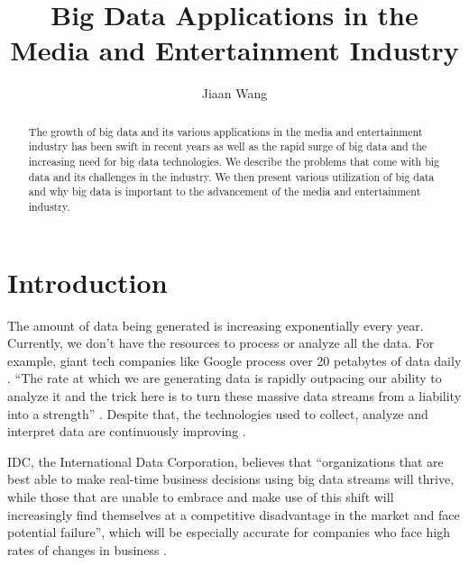 \title{Big Data Applications in the Media and Entertainment Industry}


\author{Jiaan Wang}


\begin{abstract}

    The growth of big data and its various applications in the media and entertainment 
    industry has been swift in recent years as well as the rapid surge of big data 
    and the increasing need for big data technologies. We describe the problems 
    that come with big data and its challenges in the industry. We then present 
    various utilization of big data and why big data is important to the advancement 
    of the media and entertainment industry. 
    
\end{abstract}


\maketitle

\section{Introduction}

The amount of data being generated is increasing exponentially every year. Currently, we don't have the resources to process or analyze all the data. For example, giant tech companies like Google process over 20 petabytes of data daily \cite{Schlieski2012data}. ``The rate at which we are generating data is rapidly outpacing our ability to analyze it and the trick here is to turn these massive data streams from a liability into a strength'' \cite{Browning2015laptop}. Despite that, the technologies used to collect, analyze and interpret data are continuously improving \cite{Schlieski2012data}.

IDC, the International Data Corporation, believes that ``organizations that are best able to make real-time business decisions using big data streams will thrive, while those that are unable to embrace and make use of this shift will increasingly find themselves at a competitive disadvantage in the market and face potential failure'', which will be especially accurate for companies who face high rates of changes in business \cite{Villars2011care}.


